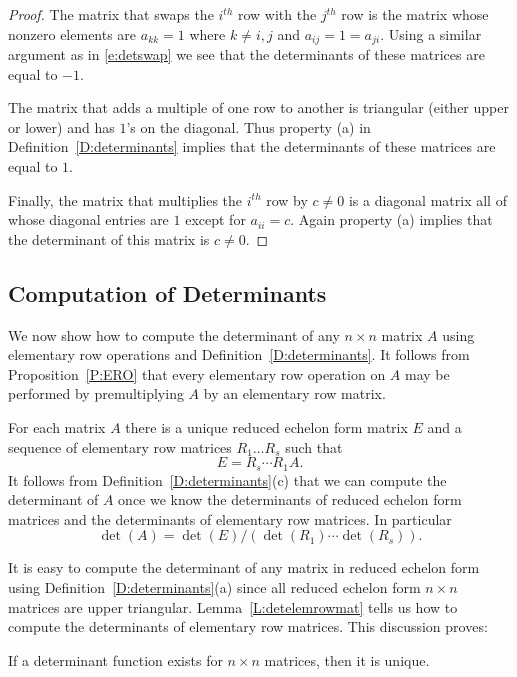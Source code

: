 \documentclass{ximera}
\begin{document}
\begin{proof} The matrix that swaps the $i^{th}$ row with the $j^{th}$
row is the matrix whose nonzero elements are $a_{kk}=1$ where
$k\neq i,j$ and $a_{ij}=1=a_{ji}$.  Using a similar argument as
in \eqref{e:detswap} we see that the determinants of these
matrices are equal to $-1$.
 
The matrix that adds a multiple of one row to another is
triangular (either upper or lower) and has $1$'s on the
diagonal.  Thus property (a) in Definition~\ref{D:determinants}
implies that the determinants of
these matrices are equal to $1$.
 
Finally, the matrix that multiplies the $i^{th}$ row by $c\neq
0$ is a diagonal matrix all of whose diagonal entries are $1$
except for $a_{ii}=c$.  Again property (a) implies that the
determinant of this matrix is $c\neq 0$. \end{proof}


\subsection*{Computation of Determinants}

We now show how to compute the determinant of any $n\times n$ matrix $A$ 
using elementary row operations and Definition~\ref{D:determinants}.  It 
follows from Proposition~\ref{P:ERO} that every elementary row operation 
on $A$ may be performed by premultiplying $A$ by an elementary row matrix. 

For each matrix $A$ there is a unique 
reduced echelon form matrix
$E$ and a sequence of elementary row matrices $R_1\ldots R_s$
such that 
\begin{equation}  \label{e:rowreduction}
E = R_s\cdots R_1A.
\end{equation}
It follows from Definition~\ref{D:determinants}(c) that we can
compute the determinant of $A$ once we know the determinants of
reduced echelon form matrices and the determinants of elementary
row matrices.  In particular
\begin{equation}  \label{e:detformula}
\det(A) = \det(E)/(\det(R_1)\cdots\det(R_s)).
\end{equation}

It is easy to compute the determinant of any matrix in reduced echelon 
form using Definition~\ref{D:determinants}(a) since all reduced echelon 
form $n\times n$ matrices are upper triangular.  Lemma~\ref{L:detelemrowmat}  
tells us how to compute the determinants of elementary row matrices.  This 
discussion proves: 
\begin{proposition}
If a determinant function exists for $n\times n$ matrices, then it is unique. 
\end{proposition}
\end{document}
